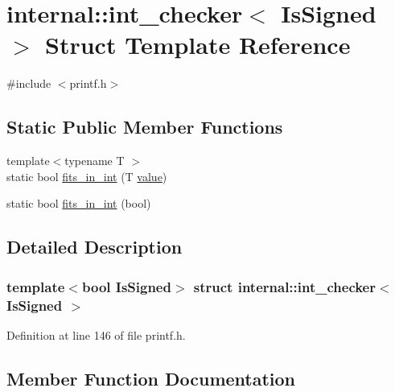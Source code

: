 \hypertarget{structinternal_1_1int__checker}{}\section{internal\+:\+:int\+\_\+checker$<$ Is\+Signed $>$ Struct Template Reference}
\label{structinternal_1_1int__checker}


{\ttfamily \#include $<$printf.\+h$>$}

\subsection*{Static Public Member Functions}
\begin{DoxyCompactItemize}
\item 
{\footnotesize template$<$typename T $>$ }\\static bool \hyperlink{structinternal_1_1int__checker_af9178cfc98046c4321b2c98f5298c355}{fits\+\_\+in\+\_\+int} (T \hyperlink{classinternal_1_1value}{value})
\item 
static bool \hyperlink{structinternal_1_1int__checker_ad3e67a68050c931ed10605dae0ee3d1b}{fits\+\_\+in\+\_\+int} (bool)
\end{DoxyCompactItemize}


\subsection{Detailed Description}
\subsubsection*{template$<$bool Is\+Signed$>$\newline
struct internal\+::int\+\_\+checker$<$ Is\+Signed $>$}



Definition at line 146 of file printf.\+h.



\subsection{Member Function Documentation}
\mbox{\label{structinternal_1_1int__checker_af9178cfc98046c4321b2c98f5298c355}} 
